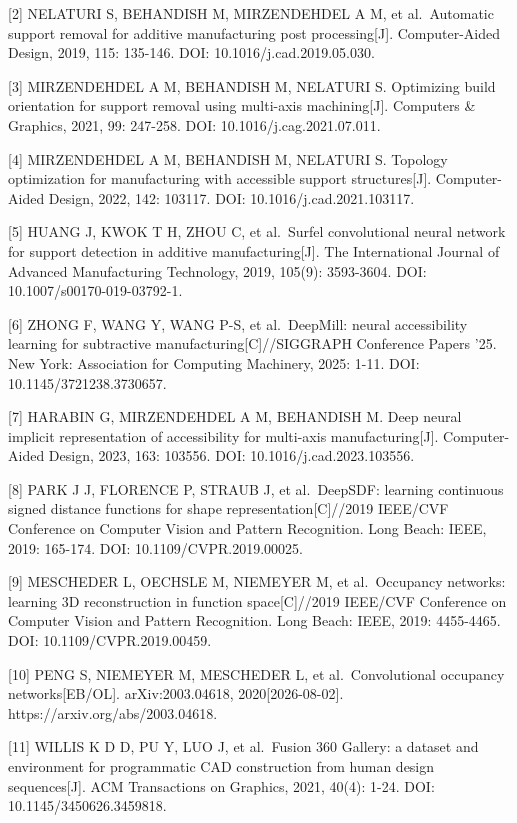 {[}2{]} NELATURI S, BEHANDISH M, MIRZENDEHDEL A M, et al.~Automatic support removal for additive manufacturing post processing{[}J{]}. Computer-Aided Design, 2019, 115: 135-146. DOI: 10.1016/j.cad.2019.05.030.

{[}3{]} MIRZENDEHDEL A M, BEHANDISH M, NELATURI S. Optimizing build orientation for support removal using multi-axis machining{[}J{]}. Computers \& Graphics, 2021, 99: 247-258. DOI: 10.1016/j.cag.2021.07.011.

{[}4{]} MIRZENDEHDEL A M, BEHANDISH M, NELATURI S. Topology optimization for manufacturing with accessible support structures{[}J{]}. Computer-Aided Design, 2022, 142: 103117. DOI: 10.1016/j.cad.2021.103117.

{[}5{]} HUANG J, KWOK T H, ZHOU C, et al.~Surfel convolutional neural network for support detection in additive manufacturing{[}J{]}. The International Journal of Advanced Manufacturing Technology, 2019, 105(9): 3593-3604. DOI: 10.1007/s00170-019-03792-1.

{[}6{]} ZHONG F, WANG Y, WANG P-S, et al.~DeepMill: neural accessibility learning for subtractive manufacturing{[}C{]}//SIGGRAPH Conference Papers '25. New York: Association for Computing Machinery, 2025: 1-11. DOI: 10.1145/3721238.3730657.

{[}7{]} HARABIN G, MIRZENDEHDEL A M, BEHANDISH M. Deep neural implicit representation of accessibility for multi-axis manufacturing{[}J{]}. Computer-Aided Design, 2023, 163: 103556. DOI: 10.1016/j.cad.2023.103556.

{[}8{]} PARK J J, FLORENCE P, STRAUB J, et al.~DeepSDF: learning continuous signed distance functions for shape representation{[}C{]}//2019 IEEE/CVF Conference on Computer Vision and Pattern Recognition. Long Beach: IEEE, 2019: 165-174. DOI: 10.1109/CVPR.2019.00025.

{[}9{]} MESCHEDER L, OECHSLE M, NIEMEYER M, et al.~Occupancy networks: learning 3D reconstruction in function space{[}C{]}//2019 IEEE/CVF Conference on Computer Vision and Pattern Recognition. Long Beach: IEEE, 2019: 4455-4465. DOI: 10.1109/CVPR.2019.00459.

{[}10{]} PENG S, NIEMEYER M, MESCHEDER L, et al.~Convolutional occupancy networks{[}EB/OL{]}. arXiv:2003.04618, 2020{[}2026-08-02{]}. https://arxiv.org/abs/2003.04618.

{[}11{]} WILLIS K D D, PU Y, LUO J, et al.~Fusion 360 Gallery: a dataset and environment for programmatic CAD construction from human design sequences{[}J{]}. ACM Transactions on Graphics, 2021, 40(4): 1-24. DOI: 10.1145/3450626.3459818.

